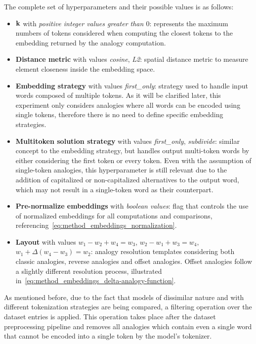 The complete set of hyperparameters and their possible values is as follows:
\begin{itemize}
    \item $\bm{\mathbf{k}}$ with \emph{positive integer values greater than $0$}: represents the maximum numbers of tokens considered when computing the closest tokens to the embedding returned by the analogy computation.
    \item \textbf{Distance metric} with values \emph{cosine}, \emph{L2}: spatial distance metric to measure element closeness inside the embedding space.
    \item \textbf{Embedding strategy} with values \emph{first\_only}: strategy used to handle input words composed of multiple tokens.
As it will be clarified later, this experiment only considers analogies where all words can be encoded using single tokens, therefore there is no need to define specific embedding strategies.
    \item \textbf{Multitoken solution strategy} with values \emph{first\_only}, \emph{subdivide}: similar concept to the embedding strategy, but handles output multi-token words by either considering the first token or every token.
Even with the assumption of single-token analogies, this hyperparameter is still relevant due to the addition of capitalized or non-capitalized alternatives to the output word, which may not result in a single-token word as their counterpart.
    \item \textbf{Pre-normalize embeddings} with \emph{boolean values}: flag that controls the use of normalized embeddings for all computations and comparisons, referencing~\cref{eq:method_embeddings_normalization}.
    \item \textbf{Layout} with values $w_1 - w_2 + w_4 = w_3$, $w_2 - w_1 + w_3 = w_4$, $w_1 + \Delta(w_4 - w_3) = w_2$: analogy resolution templates considering both classic analogies, reverse analogies and offset analogies.
Offset analogies follow a slightly different resolution process, illustrated in~\cref{eq:method_embeddings_delta-analogy-function}.
\end{itemize}

As mentioned before, due to the fact that models of dissimilar nature and with different tokenization strategies are being compared, a filtering operation over the dataset entries is applied.
This operation takes place after the dataset preprocessing pipeline and removes all analogies which contain even a single word that cannot be encoded into a single token by the model's tokenizer.

